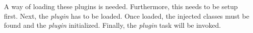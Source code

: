 A way of loading these plugins is needed.
Furthermore, this needs to be setup first.
Next, the \textit{plugin} has to be loaded.
Once loaded, the injected classes must be found and the \textit{plugin} initialized.
Finally, the \textit{plugin} task will be invoked.





